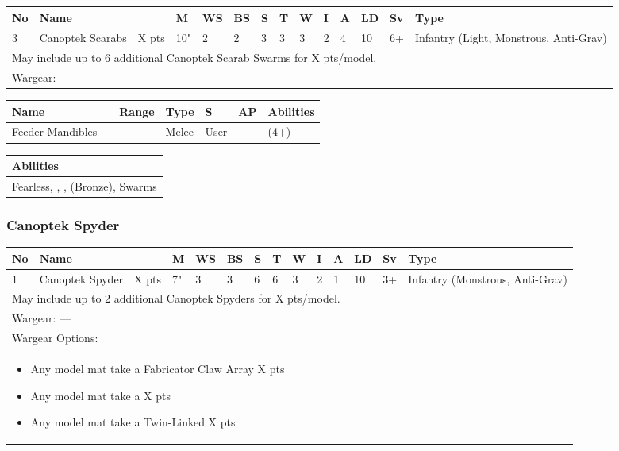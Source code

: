 \noindent
\begin{tabular}{||m{10pt} m{95pt} m{30pt} m{11pt} m{11pt} m{11pt} m{11pt} m{11pt} m{11pt} m{11pt} m{11pt} m{11pt} m{11pt} m{125pt}||}
	\hline
	No & Name & & M & WS & BS & S & T & W & I & A & LD & Sv & Type \\
	\hline
	3 & Canoptek Scarabs & X pts & 10" & 2 & 2 & 3 & 3 & 3 & 2 & 4 & 10 & 6+ & Infantry (Light, Monstrous, Anti-Grav)\\
	\hline
	\hline
	\multicolumn{14}{||Z{532 pt}||}{May include up to 6 additional Canoptek Scarab Swarms for X pts/model.}\\		
	\hline
	\hline
	\multicolumn{14}{||Z{532 pt}||}{Wargear: —}\\
	\hline
\end{tabular}

\noindent
\begin{tabular}{||m{110pt} m{30pt} m{31pt} m{55pt} m{12pt} m{12pt} m{210pt}||}
	\hline
	Name & & Range & Type & S & AP & Abilities \\
	\hline
	Feeder Mandibles & & — & Melee & User & — & \quickref{Entropic Strike} (4+) \\
	\hline
\end{tabular}

\noindent
\begin{tabular}{||m{532pt}||}
	\hline
	Abilities \\
	\hline
	Fearless, \quickref{Living Metal}, \quickref{Reanimation Protocols}, \quickref{Soulless Hordes} (Bronze), Swarms \\
	\hline
\end{tabular}

\newpage
\subsubsection{Canoptek Spyder}

\noindent
\begin{tabular}{||m{10pt} m{95pt} m{30pt} m{11pt} m{11pt} m{11pt} m{11pt} m{11pt} m{11pt} m{11pt} m{11pt} m{11pt} m{11pt} m{125pt}||}
	\hline
	No & Name & & M & WS & BS & S & T & W & I & A & LD & Sv & Type \\
	\hline
	1 & Canoptek Spyder & X pts & 7" & 3 & 3 & 6 & 6 & 3 & 2 & 1 & 10 & 3+ & Infantry (Monstrous, Anti-Grav)\\
	\hline
	\hline
	\multicolumn{14}{||Z{532 pt}||}{May include up to 2 additional Canoptek Spyders for X pts/model.}\\		
	\hline
	\hline
	\multicolumn{14}{||Z{532 pt}||}{Wargear: —}\\
	\multicolumn{14}{||Z{532 pt}||}{Wargear Options:} \\	\multicolumn{14}{||Z{532 pt}||}{\begin{itemize}
			\item Any model mat take a Fabricator Claw Array \hrulefill X pts
			\item Any model mat take a \quickref{Gloom Prism} \hrulefill X pts
			\item Any model mat take a Twin-Linked \quickref{Particle Beamer} \hrulefill X pts
	\end{itemize}} \\
	\hline
\end{tabular}

